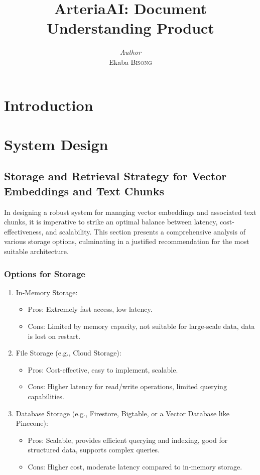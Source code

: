 \documentclass[a4paper, 12pt]{report}
\title{ArteriaAI: Document Understanding Product}
\author{\textit{Author}\\Ekaba \textsc{Bisong}}
\date{}
\begin{document}
\maketitle
\romantableofcontents



\chapter{Introduction}

\chapter{System Design}

\section{Storage and Retrieval Strategy for Vector Embeddings and Text Chunks}
In designing a robust system for managing vector embeddings and associated text chunks, it is imperative to strike an optimal balance between latency, cost-effectiveness, and scalability. This section presents a comprehensive analysis of various storage options, culminating in a justified recommendation for the most suitable architecture.

\subsection{Options for Storage}
\begin{enumerate}
    \item In-Memory Storage:
    \begin{itemize}
        \item Pros: Extremely fast access, low latency.
        \item Cons: Limited by memory capacity, not suitable for large-scale data, data is lost on restart.
    \end{itemize}
    \item File Storage (e.g., Cloud Storage):
    \begin{itemize}
        \item Pros: Cost-effective, easy to implement, scalable.
        \item Cons: Higher latency for read/write operations, limited querying capabilities.
    \end{itemize}
    \item Database Storage (e.g., Firestore, Bigtable, or a Vector Database like Pinecone):
    \begin{itemize}
        \item Pros: Scalable, provides efficient querying and indexing, good for structured data, supports complex queries.
        \item Cons: Higher cost, moderate latency compared to in-memory storage.
    \end{itemize}
\end{enumerate}
\end{document}
